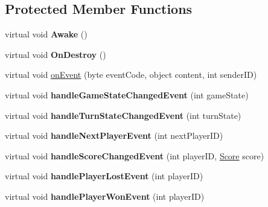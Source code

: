 \subsection*{Protected Member Functions}
\begin{DoxyCompactItemize}
\item 
virtual void {\bfseries Awake} ()\hypertarget{class_tower_v_r_1_1_tower_game_manager_impl_a3351d08f215064960524516af7e39055}{}\label{class_tower_v_r_1_1_tower_game_manager_impl_a3351d08f215064960524516af7e39055}

\item 
virtual void {\bfseries On\+Destroy} ()\hypertarget{class_tower_v_r_1_1_tower_game_manager_impl_a2aa9d1661b8b54be7309f6628a7e6128}{}\label{class_tower_v_r_1_1_tower_game_manager_impl_a2aa9d1661b8b54be7309f6628a7e6128}

\item 
virtual void \hyperlink{class_tower_v_r_1_1_tower_game_manager_impl_a325b500869bda665a71fef31783976be}{on\+Event} (byte event\+Code, object content, int sender\+ID)
\item 
virtual void {\bfseries handle\+Game\+State\+Changed\+Event} (int game\+State)\hypertarget{class_tower_v_r_1_1_tower_game_manager_impl_a1e230366e77ebf760fa5a5aacb696585}{}\label{class_tower_v_r_1_1_tower_game_manager_impl_a1e230366e77ebf760fa5a5aacb696585}

\item 
virtual void {\bfseries handle\+Turn\+State\+Changed\+Event} (int turn\+State)\hypertarget{class_tower_v_r_1_1_tower_game_manager_impl_a387b22b637c5e66e60c00ec0b3b9afa7}{}\label{class_tower_v_r_1_1_tower_game_manager_impl_a387b22b637c5e66e60c00ec0b3b9afa7}

\item 
virtual void {\bfseries handle\+Next\+Player\+Event} (int next\+Player\+ID)\hypertarget{class_tower_v_r_1_1_tower_game_manager_impl_a94c2a0d3022dd3e23095280cc5c10de4}{}\label{class_tower_v_r_1_1_tower_game_manager_impl_a94c2a0d3022dd3e23095280cc5c10de4}

\item 
virtual void {\bfseries handle\+Score\+Changed\+Event} (int player\+ID, \hyperlink{struct_tower_v_r_1_1_score}{Score} score)\hypertarget{class_tower_v_r_1_1_tower_game_manager_impl_aaec8084da6c9e63d066a327a4ceef920}{}\label{class_tower_v_r_1_1_tower_game_manager_impl_aaec8084da6c9e63d066a327a4ceef920}

\item 
virtual void {\bfseries handle\+Player\+Lost\+Event} (int player\+ID)\hypertarget{class_tower_v_r_1_1_tower_game_manager_impl_a2229c85a77dd3e8487d9d127d6a084c4}{}\label{class_tower_v_r_1_1_tower_game_manager_impl_a2229c85a77dd3e8487d9d127d6a084c4}

\item 
virtual void {\bfseries handle\+Player\+Won\+Event} (int player\+ID)\hypertarget{class_tower_v_r_1_1_tower_game_manager_impl_a048a25454703f18820253e52be426305}{}\label{class_tower_v_r_1_1_tower_game_manager_impl_a048a25454703f18820253e52be426305}

\end{DoxyCompactItemize}

